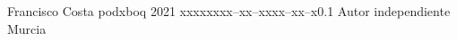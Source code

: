 \documentclass{tstextbook}
\begin{document}
    {Francisco Costa}
    {podxboq}
    {2021}
    {xxxxx}{xxx--xx--xxxx--xx--x}{0.1}
    {Autor independiente}
    {Murcia}


    








    \printbibliography{}
    \printindex
\end{document}
